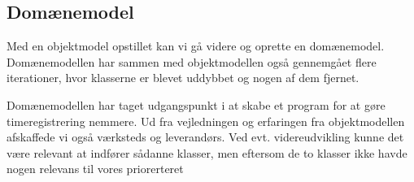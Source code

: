 \subsection{Domænemodel}

Med en objektmodel opstillet kan vi gå videre og oprette en domænemodel. Domænemodellen har sammen med objektmodellen også gennemgået flere iterationer, hvor klasserne er blevet uddybbet og nogen af dem fjernet. 

Domænemodellen har taget udgangspunkt i at skabe et program for at gøre timeregistrering nemmere. Ud fra vejledningen og erfaringen fra objektmodellen afskaffede vi også værksteds og leverandørs. Ved evt. videreudvikling kunne det være relevant at indfører sådanne klasser, men eftersom de to klasser ikke havde nogen relevans til vores priorerteret 